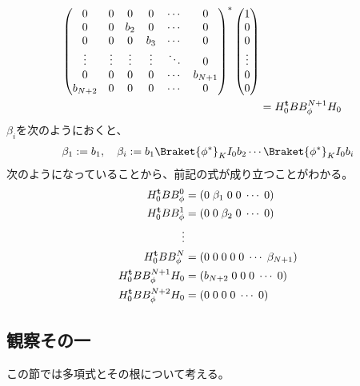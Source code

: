 {\begin{note}[計算メモ]
\begin{itemize}
\begin{equation}
\begin{split}
{\begin{pmatrix}
					0 & 0 & 0 & 0 & \cdots & 0 \\
					0 & 0 & b_2 & 0 & \cdots & 0 \\
					0 & 0 & 0 & b_3 & \cdots & 0 \\
					\vdots & \vdots & \vdots & \vdots & \ddots & 0 \\
					0 & 0 & 0 & 0 & \cdots & b_{N+1} \\
					b_{N+2} & 0 & 0 & 0 & \cdots & 0 \\
				\end{pmatrix}}^*\begin{pmatrix}
					1 \\ 0 \\ 0 \\ \vdots \\ 0 \\ 0
				\end{pmatrix} \\
				&= H_0^{\mathbf{t}} BB_\phi^{N+1}H_0
			\end{split}\end{equation}
			$\beta_i$を次のようにおくと、
			\begin{equation*}\begin{split}
				\beta_1:=b_1,\quad
				\beta_i:=b_1\Braket{\phi^*}_KI_0b_2\cdots\Braket{\phi^*}_KI_0b_i
			\end{split}\end{equation*}
			次のようになっていることから、前記の式が成り立つことがわかる。
			\begin{equation*}\begin{split}
				H_0^{\mathbf{t}} BB_\phi^0 &= (0\; \beta_1\; 0\; 0\; \cdots\; 0) \\
				H_0^{\mathbf{t}} BB_\phi^1 &= (0\; 0\; \beta_2\; 0\; \cdots\; 0) \\
				\vdots \\
				H_0^{\mathbf{t}} BB_\phi^N &= (0\; 0\; 0\; 0\; 0\; \cdots\; \beta_{N+1}) \\
				H_0^{\mathbf{t}} BB_\phi^{N+1} H_0 &= (b_{N+2}\; 0\; 0\; 0\; \cdots\; 0) \\
				H_0^{\mathbf{t}} BB_\phi^{N+2} H_0 &= (0\; 0\; 0\; 0\; \cdots\; 0)
			\end{split}\end{equation*}
		\end{itemize} %
	\end{note} %
\subsection{観察その一}\label{s2:観察その一} %
	この節では多項式とその根について考える。

}
